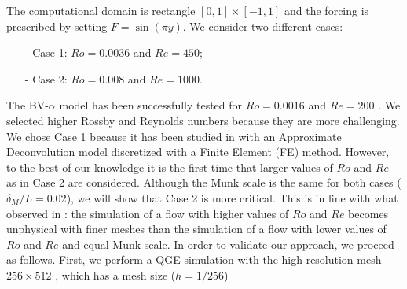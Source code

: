 \documentclass[11pt,a4paper]{article}
\begin{document}
The computational domain is rectangle $[0,1] \times [-1,1]$ and the forcing is prescribed by setting $F =\sin(\pi y)$. 
We consider two different cases:  
\begin{itemize}
\item[-] Case 1: $Ro = 0.0036$ and $Re = 450$;
\item[-] Case 2: $Ro = 0.008$ and $Re = 1000$. 
\end{itemize}
The BV-$\alpha$ model has been successfully tested for $Ro = 0.0016$ and $Re = 200$ \cite{Nadiga2001, Holm2003, Monteiro2015, Monteiro2014}. 
We selected higher Rossby and Reynolds numbers because they are more challenging. We chose Case 1 because
it has been studied in \cite{San2011} with an Approximate Deconvolution model discretized with 
a Finite Element (FE) method.
However, to the best of our knowledge it is the first time that larger values of $Ro$ and $Re$ as in Case 2 are considered. 
Although the Munk scale is the same for both cases ($\delta_M/L = 0.02$), we will show that Case 2 is more critical. 
This is in line with what observed in \cite{San2011}: the simulation of a flow with higher values of $Ro$ and $Re$ 
becomes unphysical with finer meshes than the simulation of a flow with lower values of $Ro$ and $Re$ 
and equal Munk scale.
In order to validate our approach, we proceed as follows. First, we perform a QGE simulation with 
the high resolution mesh $256 \times 512$ \cite{San2011, San2014}, which has a mesh size ($h = 1/256$) 
\end{document}
